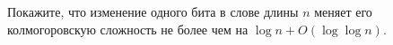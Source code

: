 Покажите, что изменение одного бита в слове длины $n$ меняет его колмогоровскую сложность не более чем на
$\log n + O(\log \log n)$.
